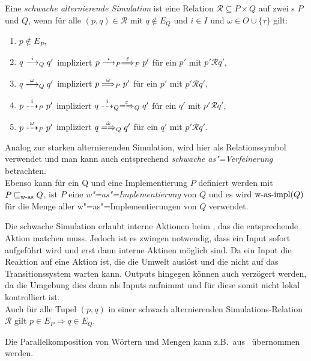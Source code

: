 \begin{Def}
  \label{wSimDef}
  Eine \emph{schwache alternierende Simulation} ist eine Relation $\mathcal{R}
  \subseteq P  \times Q$ auf zwei \MEIO{}s $P$ und $Q$, wenn für alle $(p,q)
  \in \mathcal{R}$ mit $q\notin E_Q$ und $i\in I$ und $\omega\in O\cup\{\tau\}$
  gilt:
  \begin{enumerate}
    \item $p\notin E_P$,
    \item $q\must[i]_Q q'$ impliziert $p\must[i]_P\weakmust[\varepsilon]_P p'$
      für ein $p'$ mit $p'\mathcal{R}q'$,
    \item $q\must[\omega]_Q q'$ impliziert $p\weakmust[\hat{\omega}]_P p'$ für
      ein $p'$ mit $p'\mathcal{R}q'$,
    \item $p\may[i]_P p'$ impliziert $q\may[i]_Q\weakmay[\varepsilon]_Q q'$ für
      ein $q'$ mit $p'\mathcal{R}q'$,
    \item $p\may[\omega]_P p'$ impliziert $q\weakmay[\hat{\omega}]_Q q'$ für
      ein $q'$ mit $p'\mathcal{R}q'$.
  \end{enumerate}
  Analog zur starken alternierenden Simulation, wird hier \wasRel{} als
  Relationssymbol verwendet und man kann auch entsprechend \emph{schwache
  as"=Verfeinerung} betrachten.\\
  Ebenso kann \wasRel{} für ein \MEIO{} Q und eine Implementierung $P$
  definiert werden mit $P\sqsubseteq _{\mathrm{w}\text{-}\mathrm{as}} Q$, ist $P$ eine \emph{w"=as"=Implementierung}
  von $Q$ und es wird $\mathrm{w}\text{-}\mathrm{as}\text{-}\mathrm{impl} (Q)$ für die Menge aller
  w"=as"=Implementierungen von $Q$ verwendet.
\end{Def}

Die schwache Simulation erlaubt interne Aktionen beim \MEIO{}, das die
entsprechende Aktion matchen muss. Jedoch ist es zwingen notwendig, dass ein
Input sofort aufgeführt wird und erst dann interne Aktinen möglich sind. Da
ein Input die Reaktion auf eine Aktion ist, die die Umwelt auslöst und die
nicht auf das Transitionssystem warten kann. Outputs hingegen können auch
verzögert werden, da die Umgebung dies dann als Inputs aufnimmt und für diese
somit nicht lokal kontrolliert ist.\\
Auch für alle Tupel $(p,q)$ in einer schwach alternierenden
Simulations-Relation $\mathcal{R}$ gilt $p\in E_P\Rightarrow q\in E_Q$.

Die Parallelkomposition von Wörtern und Mengen kann z.B.\
aus~\cite{Vogler2014EIO} übernommen werden.

